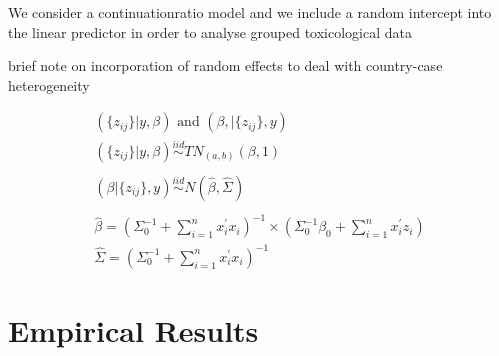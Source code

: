 We consider a continuationratio model and we include a random intercept into the linear predictor in order to analyse grouped
toxicological data


%


brief note on incorporation of random effects to deal with country-case heterogeneity

\begin{eqnarray}
	(\{z_{ij}\} | y,\beta)\text{ and }(\beta,|\{z_{ij}\},y) \nonumber \\
	(\{z_{ij}\} | y,\beta)\stackrel{iid}{\sim}TN_{(a,b)}(\beta,1) \nonumber \\
	\nonumber \\
	(\beta | \{z_{ij}\},y)\stackrel{iid}{\sim}N(\hat{\beta},\hat{\Sigma}) \nonumber \\
	\nonumber \\
	\hat{\beta} = (\Sigma_{0}^{-1}+\sum_{i=1}^{n} x_{i}^{'}x_{i})^{-1} \times (\Sigma_{0}^{-1}\beta_{0}+\sum_{i=1}^{n} x_{i}^{'}z_{i}) \nonumber \\
	\hat{\Sigma} = (\Sigma_{0}^{-1} + \sum_{i=1}^{n} x_{i}^{'}x_{i})^{-1} \nonumber
\end{eqnarray}


\section*{Empirical Results}

